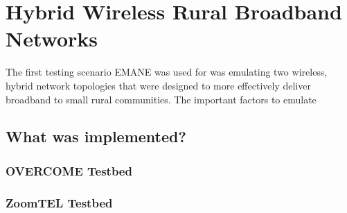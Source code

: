 \chapter{Hybrid Wireless Rural Broadband Networks}
\label{chapter3}
The first testing scenario EMANE was used for was emulating two wireless, hybrid network topologies that were designed to more effectively deliver broadband to small rural communities.
The important factors to emulate

\section{What was implemented?}

\subsection{OVERCOME Testbed}


\subsection{ZoomTEL Testbed}



